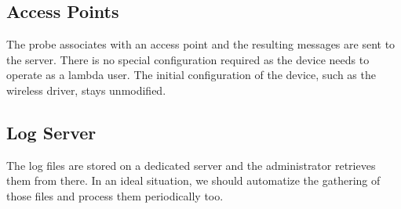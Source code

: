 \subsection{Access Points}
The probe associates with an access point and the resulting messages are sent to the server. There is no special configuration required as the device needs to operate as a lambda user. The initial configuration of the device, such as the wireless driver, stays unmodified.

\subsection{Log Server} 
The log files are stored on a dedicated server and the administrator retrieves them from there. In an ideal situation, we should automatize the gathering of those files and process them periodically too.
